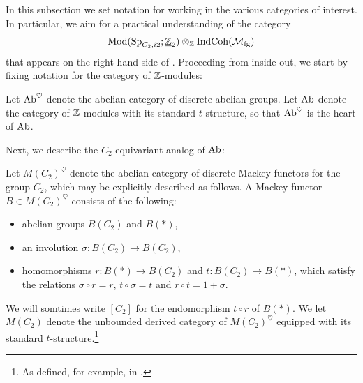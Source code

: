 In this subsection we set notation for working in the various categories of interest.
In particular, we aim for a practical understanding of the category
\[ \mathrm{Mod} ( \operatorname{\mathrm{Sp}}_{C_2, i2}; \underline{\mathbb{Z}}_{2}) \otimes_{\mathbb{Z}} \mathrm{IndCoh}(\mathcal{M}_{\mathrm{fg}}) \]
that appears on the right-hand-side of . Proceeding from inside out,
we start by fixing notation for the category of $\mathbb{Z}$-modules:

\begin{dfn}
  Let $\mathrm{Ab}^{\heartsuit}$ denote the abelian category of discrete abelian groups.
  Let $\mathrm{Ab}$ denote the category of $\mathbb{Z}$-modules with its standard $t$-structure,
  so that $\mathrm{Ab}^{\heartsuit}$ is the heart of $\mathrm{Ab}$.
\end{dfn}



Next, we describe the $C_2$-equivariant analog of $\mathrm{Ab}$:

\begin{dfn} \label{dfn:mackey}
  Let $M(C_2)^{\heartsuit}$ denote the abelian category of discrete Mackey functors for the group $C_2$,
  which may be explicitly described as follows.
  A Mackey functor $B \in M(C_2) ^{\heartsuit}$ consists of the following:
  \begin{itemize}
    \item abelian groups $B(C_2)$ and $B(\ast)$,
    \item an involution $\sigma : B(C_2) \to B(C_2)$,
    \item homomorphisms $r : B(\ast) \to B(C_2)$ and $t : B(C_2) \to B(\ast)$,
     which satisfy the relations $\sigma \circ r = r$, $t \circ \sigma = t$ and $r \circ t = 1 + \sigma$.
  \end{itemize}
  We will somtimes write $[C_2]$ for the endomorphism $t \circ r$ of $B(*)$.
  We let $M(C_2)$ denote the unbounded derived category of $M(C_2)^{\heartsuit}$ equipped with its standard $t$-structure.\footnote{As defined, for example, in \cite[Definition 1.3.5.8]{HA}.}
\end{dfn}

